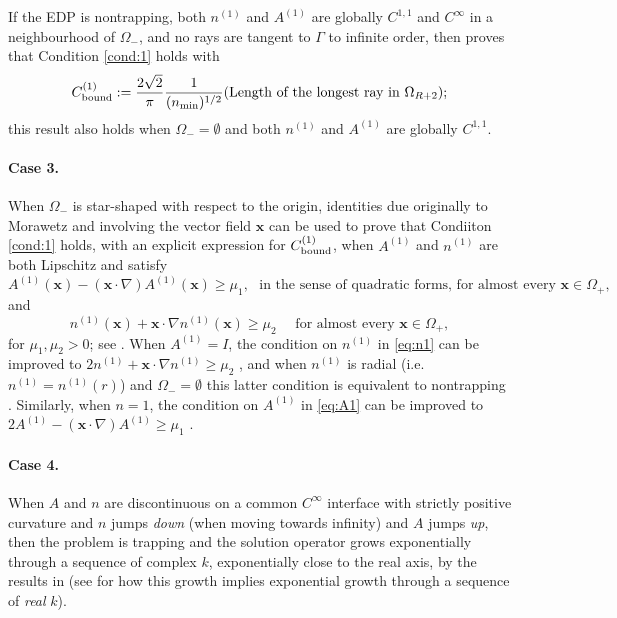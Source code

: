 \documentclass[10pt]{article}%
\numberwithin{equation}{section}
\newcommand{\beq}{\begin{equation}}
\newcommand{\eeq}{\end{equation}}
\newcommand{\beqs}{\begin{equation*}}
\newcommand{\eeqs}{\end{equation*}}
\newcommand{\bx}{\mathbf{x}}
\newcommand{\Oi}{{\Omega_-}}
\newcommand{\domain}{\Omega}
\newcommand{\coeffAo}{A^{(1)}}
\newcommand{\coeffno}{n^{(1)}}
\begin{document}
If the EDP is nontrapping, both $\coeffno$ and $\coeffAo$ are globally $C^{1,1}$ and $C^\infty$ in a neighbourhood of $\Oi$, and no rays are tangent to $\Gamma$ to infinite order, 
then \cite[Theorem 2 and Equation 6.32]{GaSpWu:18} proves that Condition \ref{cond:1} holds with
\beqs
C^{(1)}_{\rm bound} := \frac{2\sqrt{2}}{\pi} \frac{1}{ (n_{\rm min})^{1/2}} \text{(Length of the longest ray in $\Omega_{R+2}$)};
\eeqs
this result also holds when $\Oi=\emptyset$ and both $\coeffno$ and $\coeffAo$ are globally $C^{1,1}$.

\paragraph{Case 3.}
When $\Oi$ is star-shaped with respect to the origin, identities due originally to Morawetz and involving the vector field $\bx$ can be used to prove that Condiiton \ref{cond:1} holds, with an explicit expression for $C^{(1)}_{\rm bound}$, when $\coeffAo$ and $\coeffno$ are both Lipschitz and satisfy
\beq\label{eq:A1}
\coeffAo(\bx) - (\bx\cdot\nabla)\coeffAo(\bx) \geq \mu_1,\,\, \text{ in the sense of quadratic forms, for almost every }\bx\in \domain_+,
\eeq
and 
\beq\label{eq:n1}
\coeffno(\bx)+ \bx\cdot\nabla \coeffno(\bx) \geq \mu_2 \quad\text{ for almost every }\bx\in \domain_+,
\eeq
for $\mu_1, \mu_2>0$;
see \cite[Theorem 2.5]{GrPeSp:18}. When $\coeffAo= I$, the condition on $\coeffno$ in \eqref{eq:n1} can be improved to $2\coeffno + \bx \cdot \nabla \coeffno \geq \mu_2$ \cite[Theorem 2.19(ii)]{GrPeSp:18}, and when $\coeffno$ is radial (i.e.~$\coeffno= \coeffno(r)$) and $\Oi=\emptyset$ this latter condition is equivalent to nontrapping \cite[Theorem 7.7]{GrPeSp:18}.
Similarly, when $n= 1$, the condition on $\coeffAo$ in \eqref{eq:A1} can be improved to $2\coeffAo - (\bx\cdot\nabla)\coeffAo \geq \mu_1$
\cite[Theorem 2.19(i)]{GrPeSp:18}.

\paragraph{Case 4.}
When $A$ and $n$ are discontinuous on a common $C^\infty$ interface with strictly positive curvature and $n$ jumps \emph{down} (when moving towards infinity) and $A$ jumps \emph{up}, then the problem is trapping and the solution operator grows exponentially through a sequence of complex $k$, exponentially close to the real axis, by the results in \cite{PoVo:99} (see \cite[\S6]{MoSp:17} for how this growth implies exponential growth through a sequence of \emph{real} $k$).
\end{document}
